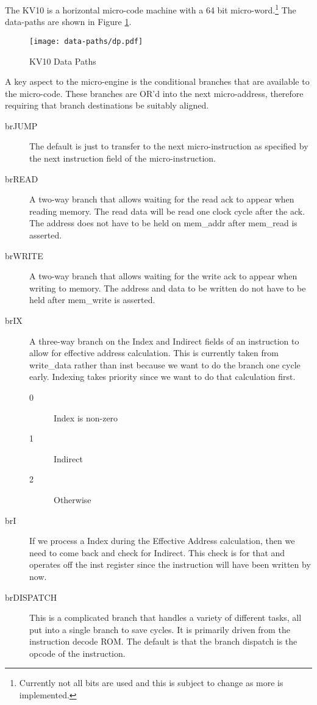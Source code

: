 \documentclass[12pt]{report}
\newcommand{\code}[1]{\textsf{#1}}
\begin{document}
The KV10 is a horizontal micro-code machine with a 64 bit micro-word.\footnote{Currently not all
  bits are used and this is subject to change as more is implemented.}  The data-paths are shown
in Figure \ref{datapaths}.


\begin{figure}
  \texttt{[image: data-paths/dp.pdf]}
  \caption{KV10 Data Paths}
  \label{datapaths}
  \end{figure}

A key aspect to the micro-engine is the conditional branches that are available to the
micro-code.  These branches are OR'd into the next micro-address, therefore requiring that
branch destinations be suitably aligned.

\begin{description}
\item[brJUMP]
  The default is just to transfer to the next micro-instruction as specified by the next
  instruction field of the micro-instruction.
\item[brREAD]
  A two-way branch that allows waiting for the read ack to appear when reading memory.  The read
  data will be read one clock cycle after the ack.  The address does not have to be held on
  mem\_addr after mem\_read is asserted.
\item[brWRITE]
  A two-way branch that allows waiting for the write ack to appear when writing to memory.  The
  address and data to be written do not have to be held after mem\_write is asserted.
\item[brIX] A three-way branch on the Index and Indirect fields of an instruction to allow for
  effective address calculation.  This is currently taken from \code{write\_data} rather than
  \code{inst} because we want to do the branch one cycle early.  Indexing takes priority since
  we want to do that calculation first.
  \begin{description}
  \item[0] Index is non-zero
  \item[1] Indirect
  \item[2] Otherwise
  \end{description}
\item[brI] If we process a Index during the Effective Address calculation, then we need to come
  back and check for Indirect.  This check is for that and operates off the \code{inst} register
  since the instruction will have been written by now.
\item[brDISPATCH] This is a complicated branch that handles a variety of different tasks, all
  put into a single branch to save cycles.  It is primarily driven from the instruction decode
  ROM.  The default is that the branch dispatch is the opcode of the instruction.


\end{description}
\end{document}
